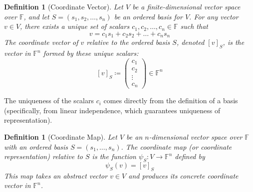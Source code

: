 \documentclass[11pt, letterpaper]{article}
\theoremstyle{mytheoremstyle}
\theoremstyle{mydefinitionstyle}
\newtheorem{definition}[theorem]{Definition}
\theoremstyle{myremarkstyle}
\newcommand{\F}{\mathbb{F}}
\newcommand{\coord}[2]{[#1]_{#2}} %
\begin{document}
\begin{definition}[Coordinate Vector]
Let $V$ be a finite-dimensional vector space over $\F$, and let $S = (s_1, s_2, \dots, s_n)$ be an ordered basis for $V$. For any vector $v \in V$, there exists a \emph{unique} set of scalars $c_1, c_2, \dots, c_n \in \F$ such that
\[ v = c_1 s_1 + c_2 s_2 + \dots + c_n s_n \]
The \emph{coordinate vector} of $v$ relative to the ordered basis $S$, denoted $\coord{v}{S}$, is the vector in $\F^n$ formed by these unique scalars:
\[ \coord{v}{S} \coloneqq \begin{pmatrix} c_1 \\ c_2 \\ \vdots \\ c_n \end{pmatrix} \in \F^n \]
\end{definition}
The uniqueness of the scalars $c_i$ comes directly from the definition of a basis (specifically, from linear independence, which guarantees uniqueness of representation).

\begin{definition}[Coordinate Map]
Let $V$ be an $n$-dimensional vector space over $\F$ with an ordered basis $S = (s_1, \dots, s_n)$. The \emph{coordinate map} (or coordinate representation) relative to $S$ is the function $\psi_S: V \to \F^n$ defined by
\[ \psi_S(v) = \coord{v}{S} \]
This map takes an abstract vector $v \in V$ and produces its concrete coordinate vector in $\F^n$.
\end{definition}
\end{document}
